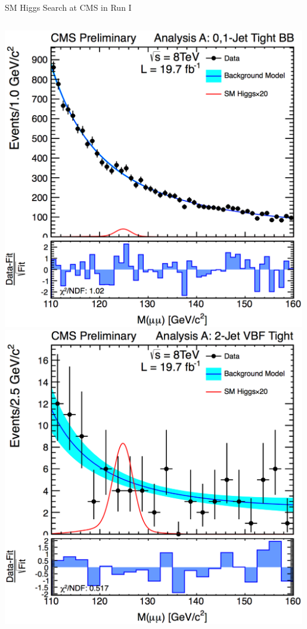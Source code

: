 \documentclass[pdf, 9pt]{beamer}
\begin{document}
\begin{frame}{SM Higgs Search at CMS in Run I}
\begin{columns}[T]
\begin{column}{0.3\textwidth}
        \includegraphics[width=0.99\textwidth, height=0.28\textheight]{figs/higgs/run1/HIGpas_fit_01JetTightBB.png}\\
        \includegraphics[width=0.99\textwidth, height=0.28\textheight]{figs/higgs/run1/HIGpas_fit_VBFTight.png}\\

\end{column}
\end{columns}
\end{frame}
\end{document}
